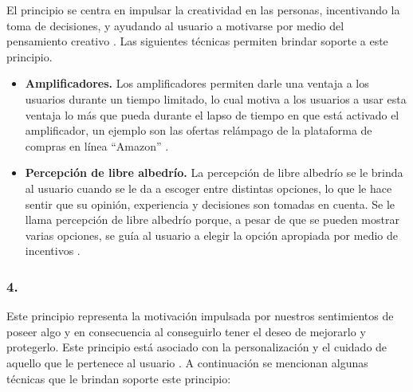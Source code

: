  El principio se centra en impulsar la creatividad en las personas, incentivando la
 toma de decisiones, y ayudando al usuario a motivarse por medio del pensamiento 
 creativo \cite[p. 126]{Octalysis}. Las siguientes técnicas permiten brindar soporte
 a este principio.

    \begin{itemize}
    \item
    {\bf Amplificadores.}
        Los amplificadores permiten darle una ventaja a los usuarios durante un tiempo limitado,
        lo cual motiva a los usuarios a usar esta ventaja lo más que pueda durante el lapso de tiempo
        en que está activado el amplificador, un ejemplo son las ofertas relámpago de la plataforma
        de compras en línea ``Amazon'' \cite[p. 146]{Octalysis}.

    \item
    {\bf Percepción de libre albedrío.}
        La percepción de libre albedrío se le brinda al usuario cuando se le da a 
        escoger entre distintas opciones, lo que le hace sentir que su opinión,
        experiencia y decisiones son tomadas en cuenta. Se le llama percepción
        de libre albedrío porque, a pesar de que se pueden mostrar varias opciones,
        se guía al usuario a elegir la opción apropiada por medio de incentivos
        \cite[p. 150]{Octalysis}.
    \end{itemize}

\subsubsection{4. \principioIV} \label{subsec:principioIV}

 Este principio representa la motivación impulsada por nuestros sentimientos de
 poseer algo y en consecuencia al conseguirlo tener el deseo de mejorarlo y
 protegerlo. Este principio está asociado con la personalización y el cuidado de 
 aquello que le pertenece al usuario \cite[p. 161]{Octalysis}. A continuación se
 mencionan algunas técnicas que le brindan soporte este principio:

